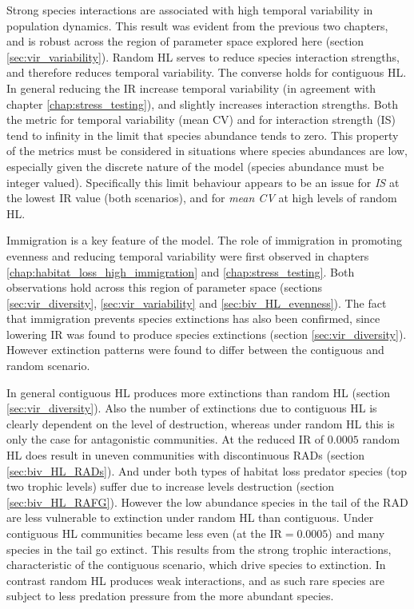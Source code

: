 Strong species interactions are associated with high temporal variability in population dynamics. This result was evident from the previous two chapters, and is robust across the region of parameter space explored here (section \ref{sec:vir_variability}). Random HL serves to reduce species interaction strengths, and therefore reduces temporal variability. The converse holds for contiguous HL. In general reducing the IR increase temporal variability (in agreement with chapter \ref{chap:stress_testing}), and slightly increases interaction strengths. Both the metric for temporal variability (mean CV) and for interaction strength (IS) tend to infinity in the limit that species abundance tends to zero. This property of the metrics must be considered in situations where species abundances are low, especially given the discrete nature of the model (species abundance must be integer valued). Specifically this limit behaviour appears to be an issue for \emph{IS} at the lowest IR value (both scenarios), and for \emph{mean CV} at high levels of random HL.

Immigration is a key feature of the model. The role of immigration in promoting evenness and reducing temporal variability were first observed in chapters \ref{chap:habitat_loss_high_immigration} and \ref{chap:stress_testing}. Both observations hold across this region of parameter space (sections \ref{sec:vir_diversity}, \ref{sec:vir_variability} and \ref{sec:biv_HL_evenness}). The fact that immigration prevents species extinctions has also been confirmed, since lowering IR was found to produce species extinctions (section \ref{sec:vir_diversity}). However extinction patterns were found to differ between the contiguous and random scenario. 

In general contiguous HL produces more extinctions than random HL (section \ref{sec:vir_diversity}). Also the number of extinctions due to contiguous HL is clearly dependent on the level of destruction, whereas under random HL this is only the case for antagonistic communities. At the reduced IR of $0.0005$ random HL does result in uneven communities with discontinuous RADs (section \ref{sec:biv_HL_RADs}). And under both types of habitat loss predator species (top two trophic levels) suffer due to increase levels destruction (section \ref{sec:biv_HL_RAFG}). However the low abundance species in the tail of the RAD are less vulnerable to extinction under random HL than contiguous. Under contiguous HL communities became less even (at the IR$=0.0005$) and many species in the tail go extinct. This results from the strong trophic interactions, characteristic of the contiguous scenario, which drive species to extinction. In contrast random HL produces weak interactions, and as such rare species are subject to less predation pressure from the more abundant species. 

